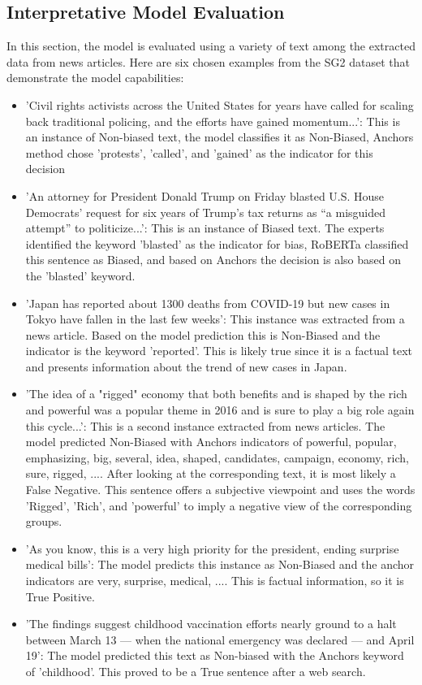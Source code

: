 \documentclass[11pt,a4paper]{article}
\begin{document}
\subsection{Interpretative Model Evaluation}
In this section, the model is evaluated using a variety of text among the extracted data from news articles. Here are six chosen examples from the SG2 dataset that demonstrate the model capabilities:
\begin{itemize}
    \item 'Civil rights activists across the United States for years have called for scaling back traditional policing, and the efforts have gained momentum...': This is an instance of Non-biased text, the model classifies it as Non-Biased, Anchors method chose 'protests', 'called', and 'gained' as the indicator for this decision
    \item 'An attorney for President Donald Trump on Friday blasted U.S. House Democrats’ request for six years of Trump’s tax returns as “a misguided attempt” to politicize...': This is an instance of Biased text. The experts identified the keyword 'blasted' as the indicator for bias, RoBERTa classified this sentence as Biased, and based on Anchors the decision is also based on the 'blasted' keyword.
    \item 'Japan has reported about 1300 deaths from COVID-19 but new cases in Tokyo have fallen in the last few weeks': This instance was extracted from a news article. Based on the model prediction this is Non-Biased and the indicator is the keyword 'reported'. This is likely true since it is a factual text and presents information about the trend of new cases in Japan.
    \item 'The idea of a "rigged" economy that both benefits and is shaped by the rich and powerful was a popular theme in 2016 and is sure to play a big role again this cycle...': This is a second instance extracted from news articles. The model predicted Non-Biased with Anchors indicators of {powerful, popular, emphasizing, big, several, idea, shaped, candidates, campaign, economy, rich, sure, rigged, ...}. After looking at the corresponding text, it is most likely a False Negative. This sentence offers a subjective viewpoint and uses the words 'Rigged', 'Rich', and 'powerful' to imply a negative view of the corresponding groups.
    \item 'As you know, this is a very high priority for the president, ending surprise medical bills': The model predicts this instance as Non-Biased and the anchor indicators are {very, surprise, medical, ...}. This is factual information, so it is True Positive.
    \item 'The findings suggest childhood vaccination efforts nearly ground to a halt between March 13 — when the national emergency was declared — and April 19': The model predicted this text as Non-biased with the Anchors keyword of 'childhood'. This proved to be a True sentence after a web search.
\end{itemize}
\end{document}
